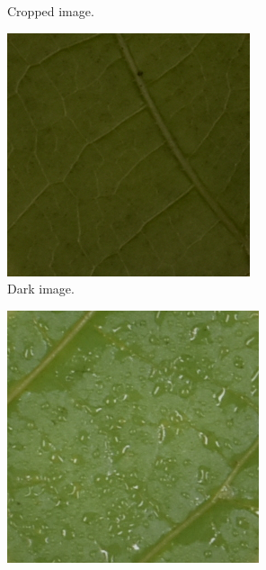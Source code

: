 \documentclass[english]{article}
\begin{document}
\begin{figure}[H]
\begin{subfigure}[b]{0.3\linewidth}
        \caption{Cropped image.}\label{fig:issuecrop}
    \end{subfigure}
    \begin{subfigure}[b]{0.3\linewidth}
        \includegraphics[width=\linewidth]{Exp21DM04_inoc2_T6_P02_c_1.png}
        \caption{Dark image.}\label{fig:issuedark}
    \end{subfigure}
    \begin{subfigure}[b]{0.3\linewidth}
        \includegraphics[width=\linewidth]{Exp22DM01_inoc1_T5_P03_a_1.png}

\end{subfigure}
\end{figure}
\end{document}
